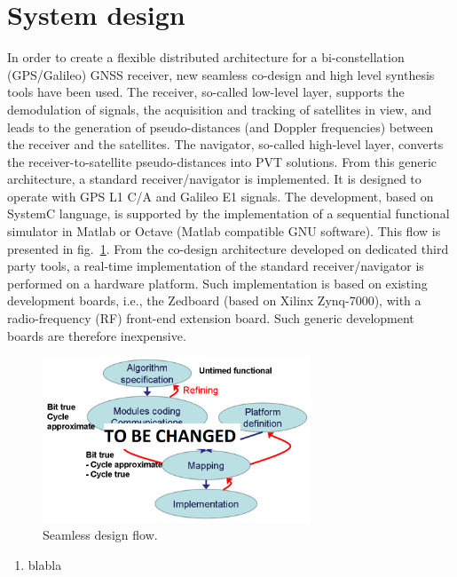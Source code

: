 \documentclass[conference]{IEEEtran}
\begin{document}
\section{System design}
In order to create  a flexible distributed architecture for a bi-constellation (GPS/Galileo) GNSS receiver, new seamless co-design and high level synthesis tools have been used. The receiver, so-called low-level layer, supports the demodulation of signals, the acquisition and tracking of satellites in view, and leads to the generation of pseudo-distances (and Doppler frequencies) between the receiver and the satellites. The navigator, so-called high-level layer, converts the receiver-to-satellite pseudo-distances into PVT solutions. From this generic architecture, a standard receiver/navigator is implemented. It is designed to operate with GPS L1 C/A and Galileo E1 signals. The development, based on SystemC language, is supported by the implementation of a sequential functional simulator in Matlab or Octave (Matlab compatible GNU software). This flow is presented in fig.~\ref{fig:DesignFlow}. From the co-design architecture developed on dedicated third party tools, a real-time implementation of the standard receiver/navigator is performed on a hardware platform. Such implementation is based on existing development boards, i.e., the Zedboard (based on Xilinx Zynq-7000), with a radio-frequency (RF) front-end extension board. Such generic development boards are therefore inexpensive. 
\begin{figure}[!ht]
\centerline{\includegraphics[width=8cm]{figs/FlotY.png}}
\caption{Seamless design flow.}
\label{fig:DesignFlow}
\end{figure}

\begin{enumerate}
\item blabla
\end{enumerate}
\end{document}
